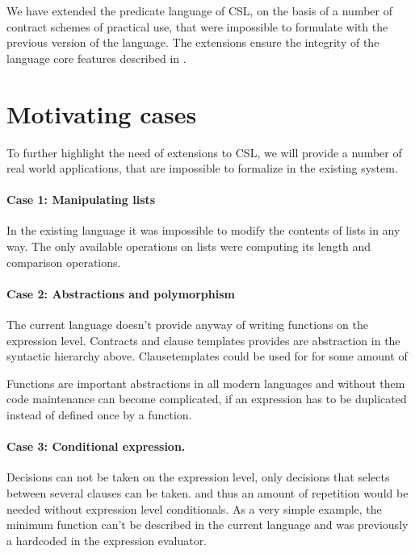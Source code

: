 \documentclass[10pt,a4paper,final,oneside,openany,article]{memoir}
\begin{document}
We have extended the predicate language of CSL, on the basis of a
number of contract schemes of practical use, that were impossible to
formulate with the previous version of the language. The extensions
ensure the integrity of the language core features described in
\cite{hvitved10}. %

\section{Motivating cases}
\label{motivation}
To further highlight the need of extensions to CSL, we will provide a
number of real world applications, that are impossible to formalize in
the existing system. 

\paragraph{Case 1: Manipulating lists} In the existing language it was
impossible to modify the contents of lists in any way. The only
available operations on lists were computing its length and comparison
operations.

\paragraph{Case 2: Abstractions and polymorphism} The current language
doesn't provide anyway of writing functions on the expression
level. Contracts and clause templates provides are abstraction in the
syntactic hierarchy above. Clausetemplates could be used for for some
amount of

Functions are important abstractions in all modern languages and
without them code maintenance can become complicated, if an expression
has to be duplicated instead of defined once by a function.

\paragraph{Case 3: Conditional expression.} Decisions can not be taken
on the expression level, only decisions that selects between several
clauses can be taken. and thus an amount of repetition would be needed
without expression level conditionals. As a very simple example, the
minimum function can't be described in the current language and was
previously a hardcoded in the expression evaluator.
\end{document}
